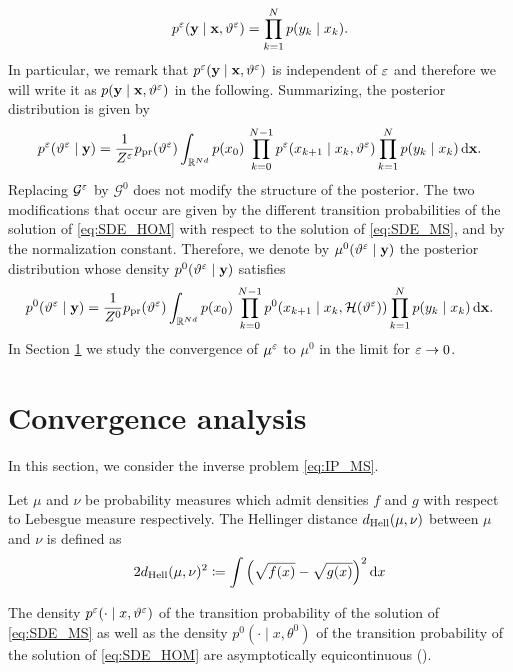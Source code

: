 \documentclass[10pt]{article}
\begin{document}
\begin{equation}
	p^\varepsilon(\mathbf y \mid \mathbf x, \vartheta^\varepsilon) = \prod_{k=1}^N p(y_k \mid x_k).
\end{equation}
In particular, we remark that $p^\varepsilon(\mathbf y \mid \mathbf x, \vartheta^\varepsilon)$ is independent of $\varepsilon$ and therefore we will write it as $p(\mathbf y \mid \mathbf x, \vartheta^\varepsilon)$ in the following. Summarizing, the posterior distribution is given by
\begin{equation}
	p^\varepsilon(\vartheta^\varepsilon \mid \mathbf y) = \frac{1}{Z^\varepsilon} p_{\mathrm{pr}}(\vartheta^\varepsilon) \int_{\mathbb{R}^{Nd}} p(x_0) \, \prod_{k=0}^{N-1} p^\varepsilon(x_{k+1} \mid x_k, \vartheta^\varepsilon)\prod_{k=1}^N p(y_k \mid x_k) \,\mathrm{d} \mathbf x.
\end{equation}
Replacing $\mathcal G^\varepsilon$ by $\mathcal G^0$ does not modify the structure of the posterior. The two modifications that occur are given by the different transition probabilities of the solution of \eqref{eq:SDE_HOM} with respect to the solution of \eqref{eq:SDE_MS}, and by the normalization constant. Therefore, we denote by $\mu^0(\vartheta^\varepsilon \mid \mathbf y)$ the posterior distribution whose density $p^0(\vartheta^\varepsilon \mid \mathbf y)$ satisfies
\begin{equation}
	p^0(\vartheta^\varepsilon \mid \mathbf y) = \frac{1}{Z^0} p_{\mathrm{pr}}(\vartheta^\varepsilon) \int_{\mathbb{R}^{Nd}} p(x_0) \, \prod_{k=0}^{N-1} p^0(x_{k+1} \mid x_k, \mathcal H(\vartheta^\varepsilon))\prod_{k=1}^N p(y_k \mid x_k) \,\mathrm{d} \mathbf x.
\end{equation}
In Section \ref{sec:Convergence} we study the convergence of $\mu^\varepsilon$ to $\mu^0$ in the limit for $\varepsilon \to 0$.  

\section{Convergence analysis}\label{sec:Convergence}

In this section, we consider the inverse problem \eqref{eq:IP_MS}. 

\begin{definition} Let $\mu$ and $\nu$ be probability measures which admit densities $f$ and $g$ with respect to Lebesgue measure respectively. The Hellinger distance $d_{\mathrm{Hell}}(\mu, \nu)$ between $\mu$ and $\nu$ is defined as
\begin{equation}
	2d_{\mathrm{Hell}}(\mu, \nu)^2 \coloneqq \int \Big(\sqrt{f(x)} - \sqrt{g(x)}\Big)^2 \,\mathrm{d} x
\end{equation}
\end{definition}

\begin{assumption}\label{as:TransitionRegularity} The density $p^\varepsilon(\cdot \mid x, \vartheta^\varepsilon)$ of the transition probability of the solution of \eqref{eq:SDE_MS} as well as the density $p^0(\cdot \mid x, \theta^0)$ of the transition probability of the solution of \eqref{eq:SDE_HOM} are asymptotically equicontinuous ().
\end{assumption}
\end{document}
